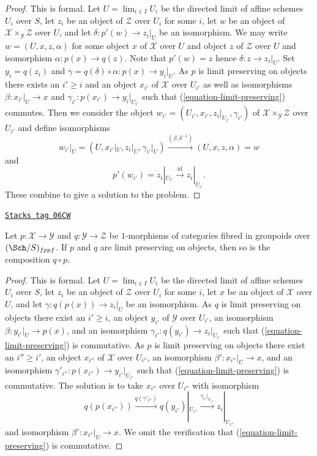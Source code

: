 \begin{proof}
This is formal. Let $U = \lim_{i \in I} U_i$ be the directed limit
of affine schemes $U_i$ over $S$, let $z_i$ be an object of $\mathcal{Z}$
over $U_i$ for some $i$, let $w$ be an object of
$\mathcal{X} \times_\mathcal{Y} \mathcal{Z}$ over $U$, and let
$\delta : p'(w) \to z_i|_U$ be an isomorphism.
We may write
$w = (U, x, z, \alpha)$ for some object $x$ of $\mathcal{X}$ over $U$
and object $z$ of $\mathcal{Z}$ over $U$ and isomorphism
$\alpha : p(x) \to q(z)$. Note that $p'(w) = z$ hence
$\delta : z \to z_i|_U$. Set $y_i = q(z_i)$ and
$\gamma = q(\delta) \circ \alpha : p(x) \to y_i|_U$.
As $p$ is limit preserving on objects there exists an $i' \geq i$
and an object $x_{i'}$ of $\mathcal{X}$ over $U_{i'}$ as well as
isomorphisms $\beta : x_{i'}|_U \to x$ and
$\gamma_{i'} : p(x_{i'}) \to y_i|_{U_{i'}}$ such that
(\ref{equation-limit-preserving}) commutes. Then we consider the object
$w_{i'} = (U_{i'}, x_{i'}, z_i|_{U_{i'}}, \gamma_{i'})$ of
$\mathcal{X} \times_\mathcal{Y} \mathcal{Z}$ over $U_{i'}$
and define isomorphisms
$$
w_{i'}|_U = (U, x_{i'}|_U, z_i|_U, \gamma_{i'}|_U)
\xrightarrow{(\beta, \delta^{-1})}
(U, x, z, \alpha) = w
$$
and
$$
p'(w_{i'}) = z_i|_{U_{i'}} \xrightarrow{\text{id}} z_i|_{U_{i'}}.
$$
These combine to give a solution to the problem.
\end{proof}

\begin{lemma}
\label{criteria-lemma-composition-limit-preserving}
\href{https://stacks.math.columbia.edu/tag/06CW}{\texttt{Stacks tag 06CW}}

Let $p : \mathcal{X} \to \mathcal{Y}$ and $q : \mathcal{Y} \to \mathcal{Z}$
be $1$-morphisms of categories fibred in groupoids over $(\Sch/S)_{fppf}$.
If $p$ and $q$ are limit preserving on objects, then so is the composition
$q \circ p$.
\end{lemma}

\begin{proof}
This is formal. Let $U = \lim_{i \in I} U_i$ be the directed limit
of affine schemes $U_i$ over $S$, let $z_i$ be an object of $\mathcal{Z}$
over $U_i$ for some $i$, let $x$ be an object of $\mathcal{X}$ over $U$,
and let $\gamma : q(p(x)) \to z_i|_U$ be an isomorphism. As $q$ is
limit preserving on objects there exist an $i' \geq i$, an object
$y_{i'}$ of $\mathcal{Y}$ over $U_{i'}$, an isomorphism
$\beta : y_{i'}|_U \to p(x)$, and an isomorphism
$\gamma_{i'} : q(y_{i'}) \to z_i|_{U_{i'}}$
such that (\ref{equation-limit-preserving}) is commutative. As $p$ is
limit preserving on objects there exist an $i'' \geq i'$, an object
$x_{i''}$ of $\mathcal{X}$ over $U_{i''}$, an isomorphism
$\beta' : x_{i''}|_U \to x$, and an isomorphism
$\gamma'_{i''} : p(x_{i''}) \to y_{i'}|_{U_{i''}}$
such that (\ref{equation-limit-preserving}) is commutative.
The solution is to take $x_{i''}$ over $U_{i''}$ with isomorphism
$$
q(p(x_{i''})) \xrightarrow{q(\gamma'_{i''})}
q(y_{i'})|_{U_{i''}} \xrightarrow{\gamma_{i'}|_{U_{i''}}}
z_i|_{U_{i''}}
$$
and isomorphism $\beta' : x_{i''}|_U \to x$. We omit the verification
that (\ref{equation-limit-preserving}) is commutative.
\end{proof}

